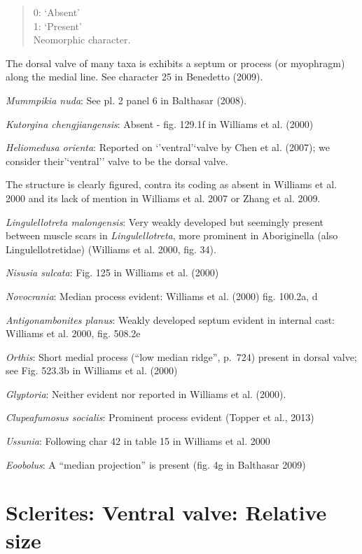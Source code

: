 \documentclass[]{book}
\theoremstyle{definition}
\theoremstyle{definition}
\theoremstyle{definition}
\theoremstyle{remark}
\begin{document}
\begin{quote}
0: `Absent'\\
1: `Present'\\
Neomorphic character.
\end{quote}

The dorsal valve of many taxa is exhibits a septum or process (or
myophragm) along the medial line. See character 25 in Benedetto (2009).

\emph{Mummpikia nuda}: See pl. 2 panel 6 in Balthasar (2008).

\emph{Kutorgina chengjiangensis}: Absent - fig. 129.1f in Williams et
al. (2000)

\emph{Heliomedusa orienta}: Reported on `'ventral'`valve by Chen et al.
(2007); we consider their'`ventral'' valve to be the dorsal valve.

The structure is clearly figured, contra its coding as absent in
Williams et al. 2000 and its lack of mention in Williams et al. 2007 or
Zhang et al. 2009.

\emph{Lingulellotreta malongensis}: Very weakly developed but seemingly
present between muscle scars in \emph{Lingulellotreta}, more prominent
in Aboriginella (also Lingulellotretidae) (Williams et al. 2000, fig.
34).

\emph{Nisusia sulcata}: Fig. 125 in Williams et al. (2000)

\emph{Novocrania}: Median process evident: Williams et al. (2000) fig.
100.2a, d

\emph{Antigonambonites planus}: Weakly developed septum evident in
internal cast: Williams et al. 2000, fig. 508.2e

\emph{Orthis}: Short medial process (``low median ridge'', p.~724)
present in dorsal valve; see Fig. 523.3b in Williams et al. (2000)

\emph{Glyptoria}: Neither evident nor reported in Williams et al.
(2000).

\emph{Clupeafumosus socialis}: Prominent process evident (Topper et al.,
2013)

\emph{Ussunia}: Following char 42 in table 15 in Williams et al. 2000

\emph{Eoobolus}: A ``median projection'' is present (fig. 4g in
Balthasar 2009)

\hypertarget{sclerites-ventral-valve-relative-size}{%
\section*{Sclerites: Ventral valve: Relative
size}\label{sclerites-ventral-valve-relative-size}}
\end{document}
